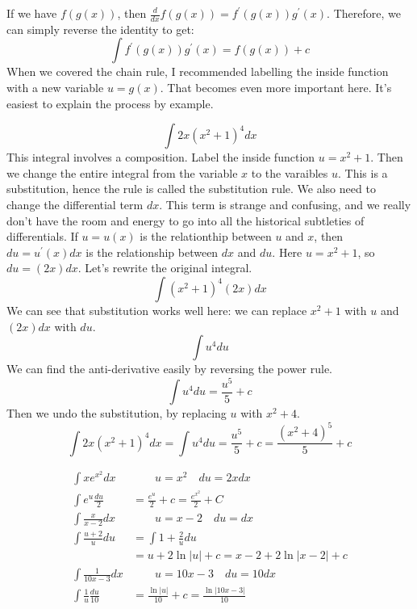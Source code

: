 \documentclass[fleqn]{report}
\begin{document}
If we have $f(g(x))$, then $\frac{d}{dx} f(g(x)) =
f^\prime(g(x)) g^\prime(x)$. Therefore, we can simply reverse
the identity to get: 
\begin{equation*}
\int f^\prime(g(x)) g^\prime(x) = f(g(x)) + c
\end{equation*}
When we covered the chain rule, I recommended labelling the inside
function with a new variable $u = g(x)$. That becomes even
more important here. It's easiest to explain the process by
example.

\begin{example} 
\begin{equation*}
\int 2x (x^2+1)^4 dx 
\end{equation*}
This integral involves a composition. 
Label the inside function $u = x^2 + 1$. Then we
change the entire integral from the variable $x$
to the varaibles $u$. This is a substitution, hence the rule
is called the substitution rule.
We also need to change the differential term $dx$. This term
is strange and confusing, and we really don't have the room
and energy to go into all the historical subtleties of
differentials. If $u =
u(x)$ is the relationthip between $u$ and $x$, then $du =
u^\prime(x) dx$ is the relationship between $dx$ and $du$.
Here $u = x^2 +1$, so $du = (2x) dx$. Let's
rewrite the original integral.
\begin{equation*}
\int (x^2+1)^4 (2x)dx 
\end{equation*}
We can see that substitution works well here: we can
replace $x^2 +1$ with $u$ and $(2x) dx$ with $du$. 
\begin{equation*}
\int u^4 du 
\end{equation*}
We can find the anti-derivative easily by reversing the power
rule.
\begin{equation*}
\int u^4 du = \frac{u^5}{5} + c
\end{equation*}
Then we undo the substitution, by replacing $u$ with $x^2+4$.
\begin{equation*}
\int 2x (x^2+1)^4 dx = \int u^4 du = \frac{u^5}{5} + c =
\frac{(x^2+4)^5}{5} + c
\end{equation*}
\end{example}

\begin{example}
\begin{align*}
\int xe^{x^2} dx & \quad \quad u=x^2 \quad du = 2xdx \\
\int e^u \frac{du}{2} & = \frac{e^u}{2} + c = \frac{e^{x^2}}{2} +
C \\
\int \frac{x}{x-2} dx & \quad \quad u = x-2 \quad du = dx \\
\int \frac{u+2}{u} du & = \int 1 + \frac{2}{u} du \\
& = u + 2 \ln |u| + c = x - 2 + 2\ln|x-2| + c \\
\int \frac{1}{10x-3} dx & \quad \quad u = 10x-3 \quad du = 10dx
\\
\int \frac{1}{u} \frac{du}{10} & = \frac{\ln |u|}{10} + c =
\frac{ \ln| 10x -3 |}{10}
\end{align*}
\end{example}
\end{document}
